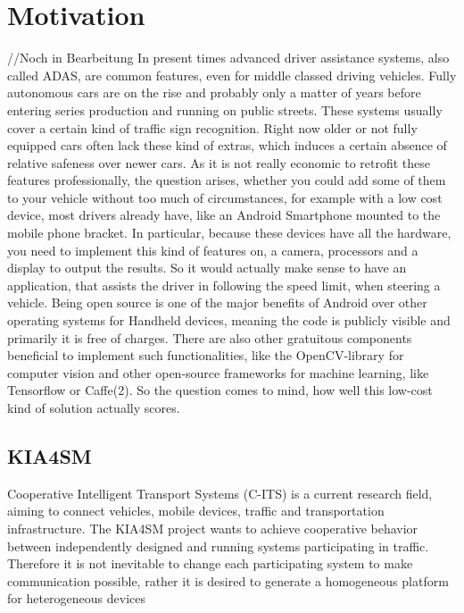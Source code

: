 
\chapter{Motivation}\label{chapter:motivation}
//Noch in Bearbeitung \newline\newline
In present times advanced driver assistance systems, also called ADAS, are common features, even for middle classed driving vehicles. Fully autonomous cars are on the rise and probably only a matter of years before entering series production and running on public streets. These systems usually cover a certain kind of traffic sign recognition. Right now older or not fully equipped cars often lack these kind of extras, which induces a certain absence of relative safeness over newer cars. As it is not really economic to retrofit these features professionally, the question arises, whether you could add some of them to your vehicle without too much of circumstances, for example with a low cost device, most drivers already have, like an Android Smartphone mounted to the mobile phone bracket. In particular, because these devices have all the hardware, you need to implement this kind of features on, a camera, processors and a display to output the results. So it would actually make sense to have an application, that assists the driver in following the speed limit, when steering a vehicle. \newline
Being open source is one of the major benefits of Android over other operating systems for Handheld devices, meaning the code is publicly visible and primarily it is free of charges. There are also other gratuitous components beneficial to implement such functionalities, like the OpenCV-library for computer vision and other open-source frameworks for machine learning, like Tensorflow or Caffe(2). So the question comes to mind, how well this low-cost kind of solution actually scores. 

\section{KIA4SM}
Cooperative Intelligent Transport Systems (C-ITS) is a current research field, aiming to connect vehicles, mobile devices, traffic and transportation infrastructure\cite{kia4sm}. The KIA4SM project wants to achieve cooperative behavior between independently designed and running systems participating in traffic. Therefore it is not inevitable to change each participating system to make communication possible, rather it is desired to generate a homogeneous platform for heterogeneous
devices


